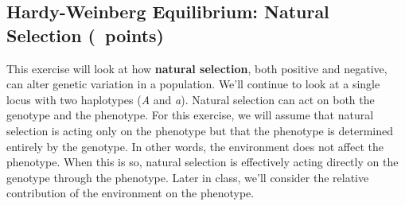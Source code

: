 \documentclass[11pt, addpoints]{exam}
\begin{document}
\subsection*{Hardy-Weinberg Equilibrium: Natural Selection (\numpoints\ points)}

This exercise will look at how \textbf{natural selection}, both positive
and negative, can alter genetic variation in a population. We'll
continue to look at a single locus with two haplotypes (\emph{A} and
\emph{a}). Natural selection can act on both the genotype and the
phenotype. For this exercise, we will assume that natural selection is
acting only on the phenotype but that the phenotype is determined
entirely by the genotype. In other words, the environment does not
affect the phenotype. When this is so, natural selection is effectively
acting directly on the genotype through the phenotype. Later in class,
we'll consider the relative contribution of the environment on the
phenotype.
\end{document}
